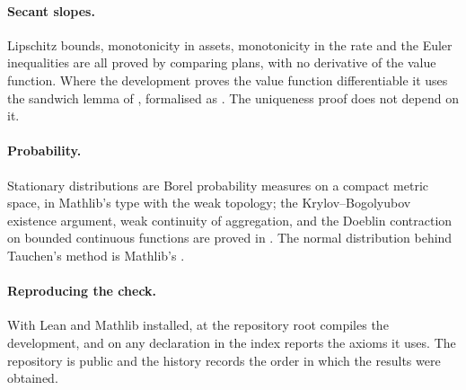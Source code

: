 \paragraph{Secant slopes.}
Lipschitz bounds, monotonicity in assets, monotonicity in the rate and the Euler inequalities are
all proved by comparing plans, with no derivative of the value function. Where the development
proves the value function differentiable it uses the sandwich lemma of \citet{ClausenStrub2020},
formalised as . The uniqueness proof does not depend on it.

\paragraph{Probability.}
Stationary distributions are Borel probability measures on a compact metric space, in Mathlib's
 type with the weak topology; the Krylov--Bogolyubov existence argument,
weak continuity of aggregation, and the Doeblin contraction on bounded continuous functions are
proved in . The normal distribution behind Tauchen's method is Mathlib's
.

\paragraph{Reproducing the check.}
With Lean and Mathlib installed,  at the repository root compiles the
development, and  on any declaration in the index reports the axioms it uses.
The repository is public and the history records the order in which the results were obtained.
